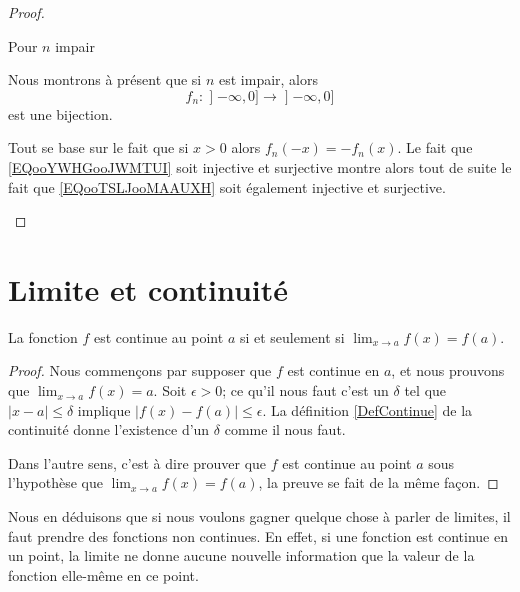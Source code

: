 \begin{proof}
\begin{subproof}
        \item[Pour \( n\) impair]

            Nous montrons à présent que si \( n\) est impair, alors 
            \begin{equation}        \label{EQooTSLJooMAAUXH}
                f_n\colon \mathopen] -\infty , 0 \mathclose]\to \mathopen] -\infty , 0 \mathclose]
            \end{equation}
            est une bijection.

            Tout se base sur le fait que si \( x>0\) alors \( f_n(-x)=-f_n(x)\). Le fait que \eqref{EQooYWHGooJWMTUI} soit injective et surjective montre alors tout de suite le fait que \eqref{EQooTSLJooMAAUXH} soit également injective et surjective.
    \end{subproof}
\end{proof}

\section{Limite et continuité}
\label{SecLimiteFontion}

\begin{theorem}           \label{ThoLimCont}
La fonction $f$ est continue au point $a$ si et seulement si $\lim_{x\to a}f(x)=f(a)$.
\end{theorem}

\begin{proof}
Nous commençons par supposer que $f$ est continue en $a$, et nous prouvons que $\lim_{x\to a}f(x)=a$. Soit $\epsilon>0$; ce qu'il nous faut c'est un $\delta$ tel que $| x-a |\leq\delta$ implique $| f(x)-f(a) |\leq\epsilon$. La définition \ref{DefContinue} de la continuité donne l'existence d'un $\delta$ comme il nous faut.

Dans l'autre sens, c'est à dire prouver que $f$ est continue au point $a$ sous l'hypothèse que $\lim_{x\to a}f(x)=f(a)$, la preuve se fait de la même façon.
\end{proof}

Nous en déduisons que si nous voulons gagner quelque chose à parler de limites, il faut prendre des fonctions non continues. En effet, si une fonction est continue en un point, la limite ne donne aucune nouvelle information que la valeur de la fonction elle-même en ce point.


